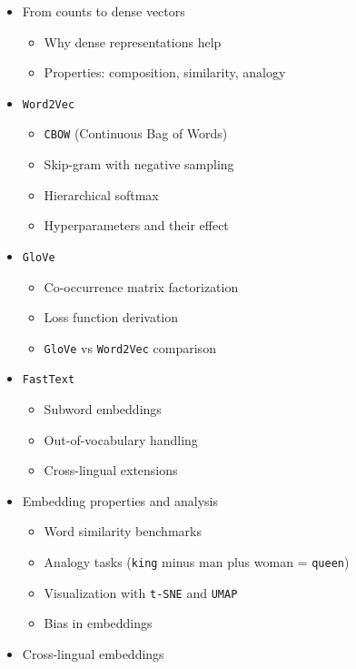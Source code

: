 \documentclass[
]{article}
\providecommand{\tightlist}{%
  \setlength{\itemsep}{0pt}\setlength{\parskip}{0pt}}
\begin{document}
\begin{itemize}
  \begin{itemize}
  \tightlist
  \item
    From counts to dense vectors

    \begin{itemize}
    \tightlist
    \item
      Why dense representations help
    \item
      Properties: composition, similarity, analogy
    \end{itemize}
  \item
    \texttt{Word2Vec}

    \begin{itemize}
    \tightlist
    \item
      \texttt{CBOW} (Continuous Bag of Words)
    \item
      Skip-gram with negative sampling
    \item
      Hierarchical softmax
    \item
      Hyperparameters and their effect
    \end{itemize}
  \item
    \texttt{GloVe}

    \begin{itemize}
    \tightlist
    \item
      Co-occurrence matrix factorization
    \item
      Loss function derivation
    \item
      \texttt{GloVe} vs \texttt{Word2Vec} comparison
    \end{itemize}
  \item
    \texttt{FastText}

    \begin{itemize}
    \tightlist
    \item
      Subword embeddings
    \item
      Out-of-vocabulary handling
    \item
      Cross-lingual extensions
    \end{itemize}
  \item
    Embedding properties and analysis

    \begin{itemize}
    \tightlist
    \item
      Word similarity benchmarks
    \item
      Analogy tasks (\texttt{king} minus man plus woman =
      \texttt{queen})
    \item
      Visualization with \texttt{t-SNE} and \texttt{UMAP}
    \item
      Bias in embeddings
    \end{itemize}
  \item
    Cross-lingual embeddings


\end{itemize}
\end{itemize}
\end{document}
